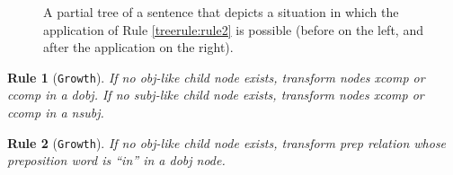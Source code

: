 \documentclass[11pt,a4paper,openright]{memoir}
\newtheorem{treerule}{Rule}
\begin{document}
\begin{figure}[!htbp]
\centering

\begin{minipage}{.5\textwidth}
\centering
{}

\end{minipage}%
\begin{minipage}{.5\textwidth}
\centering
{}

\end{minipage}

\caption[A partial tree of a sentence that depicts a tree in which the application of Rule \ref{treerule:rule2} is possible (before).]{A partial tree of a sentence that depicts a situation in which the application of Rule \ref{treerule:rule2} is possible (before on the left, and after the application on the right).}
\label{fig:rule2_before_after}
\end{figure}


\begin{treerule}[\texttt{Growth}]
\label{treerule:rule3}
If no \emph{obj}-like child node exists, transform nodes \emph{xcomp} or \emph{ccomp} in a \emph{dobj}. If no \emph{subj}-like child node exists, transform nodes \emph{xcomp} or \emph{ccomp} in a \emph{nsubj}.
\end{treerule}

\begin{treerule}[\texttt{Growth}]
\label{treerule:rule4}
If no \emph{obj}-like child node exists, transform \emph{prep} relation whose preposition word is \emph{\enquote{in}} in a \emph{dobj} node.
\end{treerule}
\end{document}
